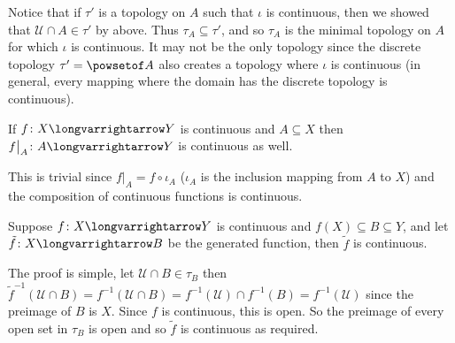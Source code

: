 \documentclass[10pt]{article}
\def\mU{\mathcal{U}}
\def\longto{\longvarrightarrow}
\begin{document}
Notice that if $\tau'$ is a topology on $A$ such that $\iota$ is continuous, then we showed that $\mU\cap A\in\tau'$ by above.
Thus $\tau_A\subseteq\tau'$, and so $\tau_A$ is the minimal topology on $A$ for which $\iota$ is continuous.
It may not be the only topology since the discrete topology $\tau'=\powsetof A$ also creates a topology where $\iota$ is continuous (in general, every mapping where the domain has the discrete topology is
continuous).

\begin{prop*}

    If $f\colon X\longto Y$ is continuous and $A\subseteq X$ then $f\big|_A\colon A\longto Y$ is continuous as well.

\end{prop*}

This is trivial since $f\bigl|_A=f\circ\iota_A$ ($\iota_A$ is the inclusion mapping from $A$ to $X$) and the composition of continuous functions is continuous.

\begin{prop*}

    Suppose $f\colon X\longto Y$ is continuous and $f(X)\subseteq B\subseteq Y$, and let $\tilde f\colon X\longto B$ be the generated function, then $\tilde f$ is continuous.

\end{prop*}

The proof is simple, let $\mU\cap B\in\tau_B$ then $\tilde f^{-1}(\mU\cap B)=f^{-1}(\mU\cap B)=f^{-1}(\mU)\cap f^{-1}(B)=f^{-1}(\mU)$ since the preimage of $B$ is $X$.
Since $f$ is continuous, this is open.
So the preimage of every open set in $\tau_B$ is open and so $\tilde f$ is continuous as required.
\end{document}
